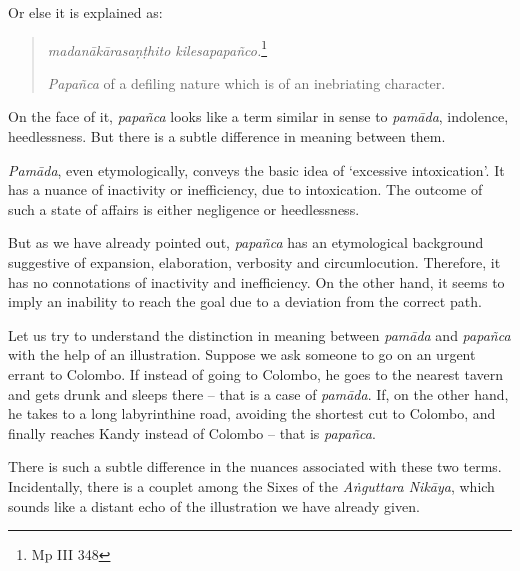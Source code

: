 Or else it is explained as:

\begin{quote}
\emph{madanākārasaṇṭhito kilesapapañco.}\footnote{Mp III 348}

\emph{Papañca} of a defiling nature which is of an inebriating character.
\end{quote}

On the face of it, \emph{papañca} looks like a term similar in sense to \emph{pamāda}, indolence, heedlessness. But there is a subtle difference in meaning between them.

\emph{Pamāda}, even etymologically, conveys the basic idea of `excessive intoxication'. It has a nuance of inactivity or inefficiency, due to intoxication. The outcome of such a state of affairs is either negligence or heedlessness.

But as we have already pointed out, \emph{papañca} has an etymological background suggestive of expansion, elaboration, verbosity and circumlocution. Therefore, it has no connotations of inactivity and inefficiency. On the other hand, it seems to imply an inability to reach the goal due to a deviation from the correct path.

Let us try to understand the distinction in meaning between \emph{pamāda} and \emph{papañca} with the help of an illustration. Suppose we ask someone to go on an urgent errant to Colombo. If instead of going to Colombo, he goes to the nearest tavern and gets drunk and sleeps there -- that is a case of \emph{pamāda}. If, on the other hand, he takes to a long labyrinthine road, avoiding the shortest cut to Colombo, and finally reaches Kandy instead of Colombo -- that is \emph{papañca}.

There is such a subtle difference in the nuances associated with these two terms. Incidentally, there is a couplet among the Sixes of the \emph{Aṅguttara Nikāya}, which sounds like a distant echo of the illustration we have already given.

